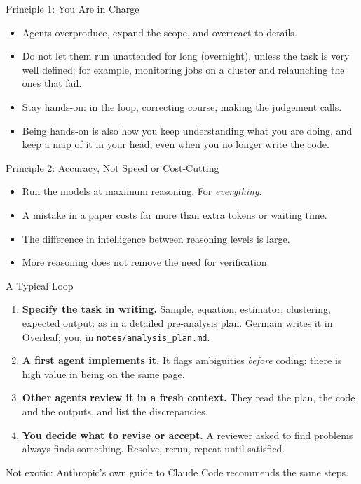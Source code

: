 \documentclass[svgnames,x11names,dvipsnames]{beamer}
\begin{document}
\begin{frame}{Principle 1: You Are in Charge}

\begin{itemize}
    \setlength{\itemsep}{8pt}
    \item Agents overproduce, expand the scope, and overreact to details.
    \item Do not let them run unattended for long (overnight), unless the task is very well defined: for example, monitoring jobs on a cluster and relaunching the ones that fail.
    \item Stay hands-on: in the loop, correcting course, making the judgement calls.
    \item Being hands-on is also how you keep understanding what you are doing, and keep a map of it in your head, even when you no longer write the code.
\end{itemize}

\end{frame}

\begin{frame}{Principle 2: Accuracy, Not Speed or Cost-Cutting}

\begin{itemize}
    \setlength{\itemsep}{8pt}
    \item Run the models at maximum reasoning. For \emph{everything}.
    \item A mistake in a paper costs far more than extra tokens or waiting time.
    \item The difference in intelligence between reasoning levels is large.
    \item More reasoning does not remove the need for verification.
\end{itemize}

\end{frame}

\begin{frame}{A Typical Loop}



\small
\begin{enumerate}
    \setlength{\itemsep}{6pt}
    \item \textbf{Specify the task in writing.} Sample, equation, estimator, clustering, expected output: as in a detailed pre-analysis plan. Germain writes it in Overleaf; you, in \texttt{notes/analysis\_plan.md}.
    \item \textbf{A first agent implements it.} It flags ambiguities \emph{before} coding: there is high value in being on the same page.
    \item \textbf{Other agents review it in a fresh context.} They read the plan, the code and the outputs, and list the discrepancies.
    \item \textbf{You decide what to revise or accept.} A reviewer asked to find problems always finds something. Resolve, rerun, repeat until satisfied.
\end{enumerate}

\vspace{0.2cm}
{\footnotesize Not exotic: Anthropic's own guide to Claude Code recommends the same steps.}

\end{frame}
\end{document}
